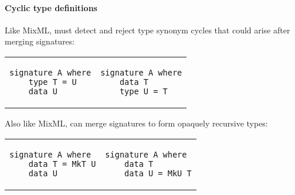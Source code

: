 \paragraph{Cyclic type definitions}

Like MixML, \Backpack{} must detect and reject type synonym cycles that
could arise after merging signatures:

\begin{tabular}{p{} p{}}
\begin{verbatim}
signature A where
    type T = U
    data U
\end{verbatim}
&
\begin{verbatim}
signature A where
    data T
    type U = T
\end{verbatim}
\end{tabular}

Also like MixML, \Backpack{} can merge signatures to form opaquely recursive types:

\begin{tabular}{p{} p{}}
\begin{verbatim}
signature A where
    data T = MkT U
    data U
\end{verbatim}
&
\begin{verbatim}
signature A where
    data T
    data U = MkU T
\end{verbatim}
\end{tabular}

\fi
